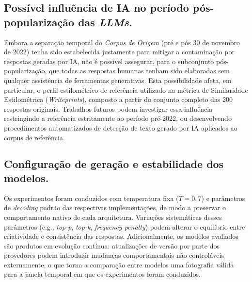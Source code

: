 \documentclass[12pt, a4paper]{article}
\numberwithin{equation}{section}
\begin{document}
 \subsection{Possível influência de IA no período pós-popularização das \textit{LLMs}.}
 Embora a separação temporal do \textit{Corpus de Origem} (pré e pós 30 de novembro de 2022) tenha
 sido estabelecida justamente para mitigar a contaminação por respostas geradas por IA, não é 
possível assegurar, para o subconjunto pós-popularização, que todas as respostas humanas tenham 
sido elaboradas sem qualquer assistência de ferramentas generativas. Esta possibilidade afeta, em 
particular, o perfil estilométrico de referência utilizado na métrica de Similaridade 
Estilométrica (\textit{Writeprints}), composto a partir do conjunto completo das 200 respostas 
originais. Trabalhos futuros podem investigar essa influência restringindo a referência 
estritamente ao período pré-2022, ou desenvolvendo procedimentos automatizados de detecção de 
texto gerado por IA aplicados ao corpus de referência.
 
 \subsection{Configuração de geração e estabilidade dos modelos.}
 Os experimentos foram conduzidos com temperatura fixa ($T = 0{,}7$) e parâmetros de 
\textit{decoding} padrão das respectivas implementações, de modo a preservar o comportamento 
nativo de cada arquitetura. Variações sistemáticas desses parâmetros (e.g., \textit{top-p}, 
\textit{top-k}, \textit{frequency penalty}) podem alterar o equilíbrio entre criatividade e 
consistência das respostas. Adicionalmente, os modelos avaliados são produtos em evolução 
contínua: atualizações de versão por parte dos provedores podem introduzir mudanças 
comportamentais não controláveis externamente, o que torna a comparação entre modelos uma 
fotografia válida para a janela temporal em que os experimentos foram conduzidos.



\end{document}
